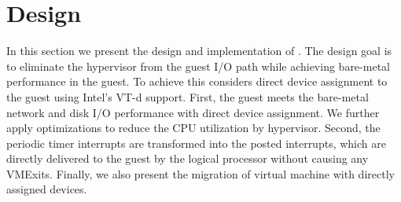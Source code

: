 \section{Design}
In this section we present the design and implementation of \name.
The design goal is to eliminate the hypervisor from the guest I/O path
while achieving bare-metal performance in the guest.
To achieve this \name considers direct device assignment to
the guest using Intel's VT-d support. First, the guest meets
the bare-metal network and disk I/O performance with
direct device assignment. We further apply optimizations to reduce
the CPU utilization by hypervisor. Second, the periodic timer interrupts
are transformed into the posted interrupts,
which are directly delivered to the guest by the logical processor
without causing any VMExits. Finally, we also present the migration
of virtual machine with directly assigned devices.
